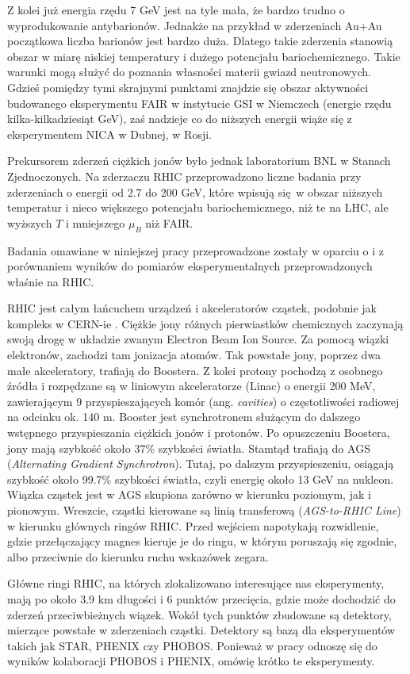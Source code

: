 \documentclass[a4paper,12pt]{article}
\begin{document}
Z kolei już energia rzędu 7 GeV jest na tyle mała, że bardzo trudno o wyprodukowanie antybarionów. Jednakże na przykład w zderzeniach Au+Au początkowa liczba barionów jest bardzo duża. Dlatego takie zderzenia stanowią obszar w miarę niskiej temperatury i dużego potencjału bariochemicznego. Takie warunki mogą służyć do poznania własności materii gwiazd neutronowych.
Gdzieś pomiędzy tymi skrajnymi punktami znajdzie się obszar aktywności budowanego eksperymentu FAIR w instytucie GSI w Niemczech (energie rzędu kilka-kilkadziesiąt GeV), zaś nadzieje co do niższych energii wiąże się z eksperymentem NICA w Dubnej, w Rosji.

Prekursorem zderzeń ciężkich jonów było jednak laboratorium BNL w Stanach Zjednoczonych. Na zderzaczu RHIC przeprowadzono liczne badania przy zderzeniach o energii od 2.7 do 200 GeV, które wpisują się w obszar niższych temperatur i nieco większego potencjału bariochemicznego, niż te na LHC, ale wyższych $T$ i mniejszego $\mu_B$ niż FAIR.

Badania omawiane w niniejszej pracy przeprowadzone zostały w oparciu o i z porównaniem wyników do pomiarów eksperymentalnych przeprowadzonych właśnie na RHIC. 

RHIC jest całym łańcuchem urządzeń i akceleratorów cząstek, podobnie jak kompleks w CERN-ie \cite{rhic-website}. Ciężkie jony różnych pierwiastków chemicznych zaczynają swoją drogę w układzie zwanym Electron Beam Ion Source. Za pomocą wiązki elektronów, zachodzi tam jonizacja atomów. Tak powstałe jony, poprzez dwa małe akceleratory, trafiają do Boostera. Z kolei protony pochodzą z osobnego źródła i rozpędzane są w liniowym akceleratorze (Linac) o energii 200 MeV, zawierającym 9 przyspieszających komór (ang. \textit{cavities}) o częstotliwości radiowej na odcinku ok. 140 m. Booster jest synchrotronem służącym do dalszego wstępnego przyspieszania ciężkich jonów i protonów. Po opuszczeniu Boostera, jony mają szybkość około 37\% szybkości światła. Stamtąd trafiają do AGS (\textit{Alternating Gradient Synchrotron}). Tutaj, po dalszym przyspieszeniu, osiągają szybkość około 99.7\% szybkości światła, czyli energię około 13 GeV na nukleon. Wiązka cząstek jest w AGS skupiona zarówno w kierunku poziomym, jak i pionowym. Wreszcie, cząstki kierowane są linią transferową (\textit{AGS-to-RHIC Line}) w kierunku głównych ringów RHIC. Przed wejściem napotykają rozwidlenie, gdzie przełączający magnes kieruje je do ringu, w którym poruszają się zgodnie, albo przeciwnie do kierunku ruchu wskazówek zegara.

Główne ringi RHIC, na których zlokalizowano interesujące nas eksperymenty, mają po około 3.9 km długości i 6 punktów przecięcia, gdzie może dochodzić do zderzeń przeciwbieżnych wiązek. Wokół tych punktów zbudowane są detektory, mierzące powstałe w zderzeniach cząstki. Detektory są bazą dla eksperymentów takich jak STAR, PHENIX czy PHOBOS. Ponieważ w pracy odnoszę się do wyników kolaboracji PHOBOS i PHENIX, omówię krótko te eksperymenty.
\end{document}
